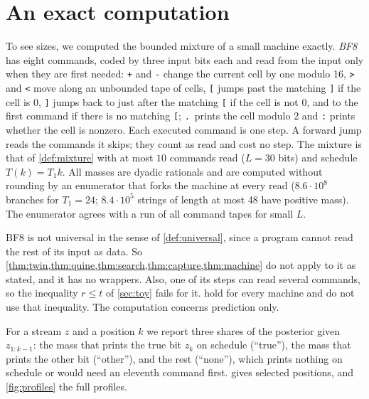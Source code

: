 \section{An exact computation}\label{sec:computation}

To see sizes, we computed the bounded mixture of a small machine exactly. \emph{BF8} has eight commands,
coded by three input bits each and read from the input only when they are first needed:
\texttt{+} and \texttt{-} change the current cell by one modulo 16, \texttt{>} and \texttt{<} move along an
unbounded tape of cells, \texttt{[} jumps past the matching \texttt{]} if the cell is $0$, \texttt{]} jumps
back to just after the matching \texttt{[} if the cell is not $0$, and to the first command if there is no
matching \texttt{[}; \texttt{.}~prints the cell modulo 2 and \texttt{:} prints whether the cell is nonzero.
Each executed command is one step. A forward jump reads the commands it skips; they count as read and cost no
step. The mixture is that of \cref{def:mixture} with at most $10$ commands read ($L=30$ bits) and schedule
$T(k)=T_1k$. All masses are dyadic rationals and are computed without rounding by an enumerator that forks the
machine at every read ($8.6\cdot10^8$ branches for $T_1=24$; $8.4\cdot10^5$ strings of length at most 48 have
positive mass). The enumerator agrees with a run of all command tapes for small $L$.

BF8 is not universal in the sense of \cref{def:universal}, since a program cannot read the rest of its input
as data. So \cref{thm:twin,thm:quine,thm:search,thm:capture,thm:machine}
do not apply to it as stated, and it has no wrappers. Also, one of its steps can read several commands, so the
inequality $r\le t$ of \cref{sec:toy} fails for it. 
hold for every machine and do not use that inequality. The computation concerns prediction only.

For a stream $z$ and a position $k$ we report three shares of the posterior given $z_{1:k-1}$: the mass that
prints the true bit $z_k$ on schedule (``true''), the mass that prints the other bit (``other''), and the rest
(``none''), which prints nothing on schedule or would need an eleventh command first. 
gives selected positions, and \cref{fig:profiles} the full profiles.

\begin{table}[ht]\centering\small

\caption{Posterior shares at selected positions, BF8 with at most 10 commands. Exact values rounded to three
places.}\label{tab:profiles}
\end{table}

